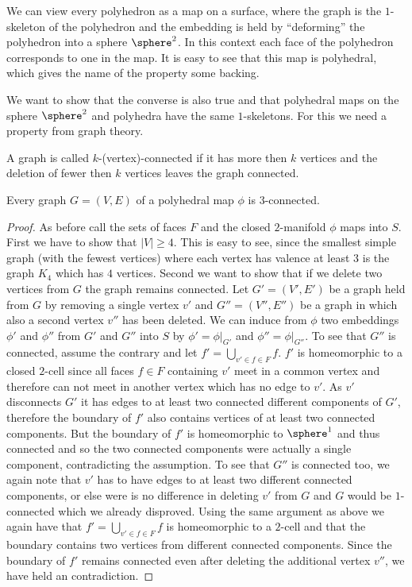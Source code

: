 \begin{remark}\label{rem:polymap:from:polyhedron}
  We can view every polyhedron as a map on a surface, where the graph is the $1$-skeleton of the polyhedron and the embedding is held by ``deforming'' the polyhedron into a sphere $\sphere^2$. In this context each face of the polyhedron corresponds to one in the map. It is easy to see that this map is polyhedral, which gives the name of the property some backing.
\end{remark}

We want to show that the converse is also true and that polyhedral maps on the sphere $\sphere^2$ and polyhedra have the same $1$-skeletons. For this we need a property from graph theory.

\begin{definition} A graph is called $k$-(vertex)-connected if it has more then $k$ vertices and the deletion of fewer then $k$ vertices leaves the graph connected.
\end{definition}

\begin{proposition} Every graph $G = (V, E)$ of a polyhedral map $\phi$ is $3$-connected.
  \begin{proof}
    As before call the sets of faces $F$ and the closed $2$-manifold $\phi$ maps into $S$. First we have to show that $|V| \geq 4$. This is easy to see, since the smallest simple graph (with the fewest vertices) where each vertex has valence at least $3$ is the graph $K_4$ which has $4$ vertices. Second we want to show that if we delete two vertices from $G$ the graph remains connected. Let $G' = (V', E')$ be a graph held from $G$ by removing a single vertex $v'$ and $G'' = (V'', E'')$ be a graph in which also a second vertex $v''$ has been deleted. We can induce from $\phi$ two embeddings $\phi'$ and $\phi''$ from $G'$ and $G''$ into $S$ by $\phi' = \phi|_{G'}$ and $\phi'' = \phi|_{G''}$. To see that $G''$ is connected, assume the contrary and let $f' = \bigcup_{v' \in f \in F} f$. $f'$ is homeomorphic to a closed $2$-cell since all faces $f \in F$ containing $v'$ meet in a common vertex and therefore can not meet in another vertex which has no edge to $v'$. As $v'$ disconnects $G'$ it has edges to at least two connected different components of $G'$, therefore the boundary of $f'$ also contains vertices of at least two connected components. But the boundary of $f'$ is homeomorphic to $\sphere^1$ and thus connected and so the two connected components were actually a single component, contradicting the assumption. To see that $G''$ is connected too, we again note that $v'$ has to have edges to at least two different connected components, or else were is no difference in deleting $v'$ from $G$ and $G$ would be $1$-connected which we already disproved. Using the same argument as above we again have that $f' = \bigcup_{v' \in f \in F} f$ is homeomorphic to a $2$-cell and that the boundary contains two vertices from different connected components. Since the boundary of $f'$ remains connected even after deleting the additional vertex $v''$, we have held an contradiction.
  \end{proof}
\end{proposition}

